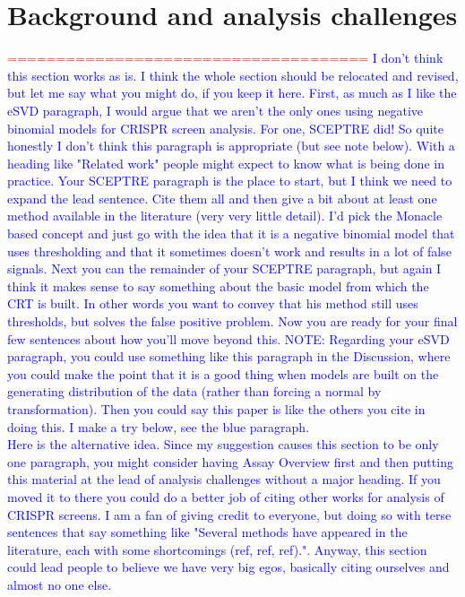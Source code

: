 \documentclass[12pt]{article}
\begin{document}
\section{Background and analysis challenges}
\iffalse
\textcolor{red}{=====================================}
\textcolor{blue}{I don't think this section works as is.  I think the whole section should be relocated and revised, but let me say what you might do, if you keep it here. First, as much as I like the eSVD paragraph, I would argue that we aren't the only ones using negative binomial models for CRISPR screen analysis. For one, SCEPTRE did! So quite honestly I don't think this paragraph is appropriate (but see note below). With a heading like "Related work" people might expect to know what is being done in practice.  Your SCEPTRE paragraph is the place to start, but I think we need to expand the lead sentence.  Cite them all and then give a bit about at least one method available in the literature (very very little detail). I'd pick the Monacle based concept and just go with the idea that it is a negative binomial model that uses thresholding and that it sometimes doesn't work and results in a lot of false signals.  Next you can the remainder of your SCEPTRE paragraph, but again I think it makes sense to say something about the basic model from which the CRT is built.  In other words you want to convey that his method still uses thresholds, but solves the false positive problem.  Now you are ready for your final few sentences about how you'll move beyond this. NOTE: Regarding your eSVD paragraph, you could use something like this paragraph in the Discussion, where you could make the point that it is a good thing when models are built on the generating distribution of the data (rather than forcing a normal by transformation).  Then you could say this paper is like the others you cite in doing this.  I make a try below, see the blue paragraph.\\
Here is the alternative idea.  Since my suggestion causes this section to be only one paragraph, you might consider having Assay Overview first and then putting this material at the lead of analysis challenges without a major heading.  If you moved it to there you could do a better job of citing other works for analysis of CRISPR screens.  I am a fan of giving credit to everyone, but doing so with terse sentences that say something like "Several methods have appeared in the literature, each with some shortcomings (ref, ref, ref).".  Anyway, this section could lead people to believe we have very big egos, basically citing ourselves and almost no one else.}
\end{document}
